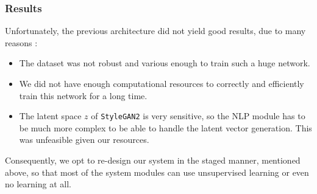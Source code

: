 \subsubsection{Results}

Unfortunately, the previous architecture did not yield good results, due to many reasons :
\begin{itemize}
    \item The dataset was not robust and various enough to train such a huge network.
    \item We did not have enough computational resources to correctly and efficiently train this network for a long time.
    \item The latent space $z$ of \texttt{StyleGAN2} is very sensitive, so the NLP module has to be much more complex to be able to handle the latent vector generation. This was unfeasible given our resources.
\end{itemize}

Consequently, we opt to re-design our system in the staged manner, mentioned above, so that most of the system modules can use unsupervised learning or even no learning at all. 
